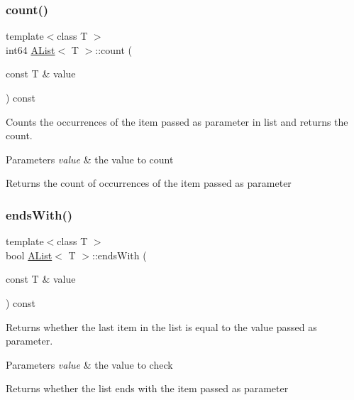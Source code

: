 \subsubsection{\texorpdfstring{count()}{count()}}
{\footnotesize\ttfamily template$<$class T $>$ \\
int64 \mbox{\hyperlink{class_a_list}{A\+List}}$<$ T $>$\+::count (\begin{DoxyParamCaption}\item[{const T \&}]{value }\end{DoxyParamCaption}) const}



Counts the occurrences of the item passed as parameter in list and returns the count. 


\begin{DoxyParams}{Parameters}
{\em value} & the value to count \\
\hline
\end{DoxyParams}
\begin{DoxyReturn}{Returns}
the count of occurrences of the item passed as parameter 
\end{DoxyReturn}
\mbox{\label{class_a_list_af6383e2209b2baa7c0e602b82d586cf9}} 
\subsubsection{\texorpdfstring{endsWith()}{endsWith()}}
{\footnotesize\ttfamily template$<$class T $>$ \\
bool \mbox{\hyperlink{class_a_list}{A\+List}}$<$ T $>$\+::ends\+With (\begin{DoxyParamCaption}\item[{const T \&}]{value }\end{DoxyParamCaption}) const}



Returns whether the last item in the list is equal to the value passed as parameter. 


\begin{DoxyParams}{Parameters}
{\em value} & the value to check \\
\hline
\end{DoxyParams}
\begin{DoxyReturn}{Returns}
whether the list ends with the item passed as parameter 
\end{DoxyReturn}
\mbox{\label{class_a_list_aca24663d0fe32d878cd4a214ade18372}} 

